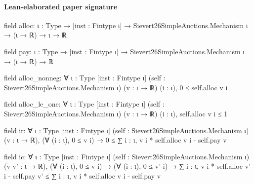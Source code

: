\documentclass[10pt]{article}
\begin{document}
\paragraph{Lean-elaborated paper signature}
\begin{ReviewVerbatim}
field alloc:
{ι : Type} → [inst : Fintype ι] → Sievert26SimpleAuctions.Mechanism ι → (ι → ℝ) → ι → ℝ

field pay:
{ι : Type} → [inst : Fintype ι] → Sievert26SimpleAuctions.Mechanism ι → (ι → ℝ) → ℝ

field alloc_nonneg:
∀ {ι : Type} [inst : Fintype ι] (self : Sievert26SimpleAuctions.Mechanism ι) (v : ι → ℝ) (i : ι), 0 ≤ self.alloc v i

field alloc_le_one:
∀ {ι : Type} [inst : Fintype ι] (self : Sievert26SimpleAuctions.Mechanism ι) (v : ι → ℝ) (i : ι), self.alloc v i ≤ 1

field ir:
∀ {ι : Type} [inst : Fintype ι] (self : Sievert26SimpleAuctions.Mechanism ι) (v : ι → ℝ),
  (∀ (i : ι), 0 ≤ v i) → 0 ≤ ∑ i : ι, v i * self.alloc v i - self.pay v

field ic:
∀ {ι : Type} [inst : Fintype ι] (self : Sievert26SimpleAuctions.Mechanism ι) (v v' : ι → ℝ),
  (∀ (i : ι), 0 ≤ v i) →
    (∀ (i : ι), 0 ≤ v' i) → ∑ i : ι, v i * self.alloc v' i - self.pay v' ≤ ∑ i : ι, v i * self.alloc v i - self.pay v
\end{ReviewVerbatim}
\end{document}
